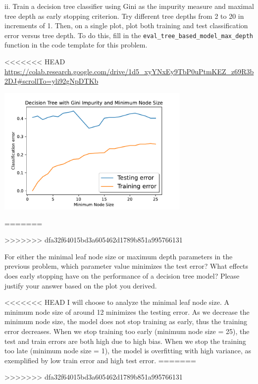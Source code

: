 ii. Train a decision tree classifier using Gini as the impurity measure and maximal tree depth as early stopping criterion. Try different tree depths from 2 to 20 in increments of 1. Then, on a single plot, plot both training and test classification error versus tree depth. To do this, fill in the \texttt{eval_tree_based_model_max_depth} function in the code template for this problem.

\begin{solution}
<<<<<<< HEAD
    \url{https://colab.research.google.com/drive/1d5_xyYNxEy9TbP0uPtmKEZ_z69R3b2DJ#scrollTo=yli92gNpDTKb}
    \begin{center}
        \includegraphics[width=0.7\textwidth]{fig1.pdf}
    \end{center}
=======
 
>>>>>>> dfa32f64015bd3a605462d1789b851a995766131
\end{solution}

\problem[6]
For either the minimal leaf node size or maximum depth parameters in the previous problem, which parameter value minimizes the test error? What effects does early stopping have on the performance of a decision tree model?
Please justify your answer based on the plot you derived.

\begin{solution}
<<<<<<< HEAD
    I will choose to analyze the minimal leaf node size. A minimum node size of around 12 minimizes the testing error. As we decrease the minimum node size, the model does not stop training as early, thus the training error decreases. When we stop training too early (minimum node size = 25), the test and train errors are both high due to high bias. When we stop the training too late (minimum node size = 1), the model is overfitting with high variance, as exemplified by low train error and high test error.
=======
   
>>>>>>> dfa32f64015bd3a605462d1789b851a995766131
\end{solution}

